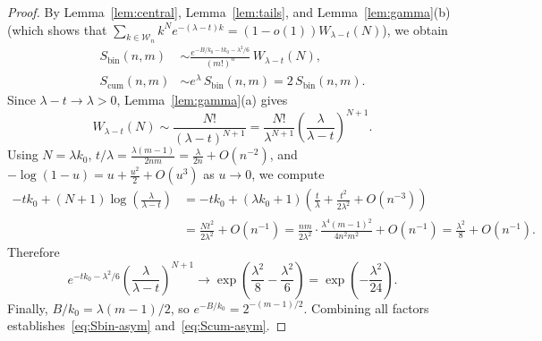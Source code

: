\documentclass[11pt,a4paper]{article}
\theoremstyle{remark}
\begin{document}
\begin{proof}
By Lemma~\ref{lem:central}, Lemma~\ref{lem:tails}, and Lemma~\ref{lem:gamma}(b) (which shows that $\sum_{k\in\mathcal{W}_n} k^N e^{-(\lambda-t)k} = (1 - o(1))W_{\lambda-t}(N)$), we obtain
\begin{align*}
  S_{\mathrm{bin}}(n,m)
  &\sim \frac{e^{-B/k_0 - t k_0 - \lambda^2/6}}{(m!)^n}\,W_{\lambda - t}(N),\\
  S_{\mathrm{cum}}(n,m)
  &\sim e^{\lambda}\,S_{\mathrm{bin}}(n,m) = 2\,S_{\mathrm{bin}}(n,m).
\end{align*}
Since $\lambda - t \to \lambda > 0$, Lemma~\ref{lem:gamma}(a) gives
\[
  W_{\lambda - t}(N) \sim \frac{N!}{(\lambda - t)^{N+1}}
  = \frac{N!}{\lambda^{N+1}}\left(\frac{\lambda}{\lambda - t}\right)^{N+1}.
\]
Using $N = \lambda k_0$, $t/\lambda = \frac{\lambda(m-1)}{2nm} = \frac{\lambda}{2n} + O(n^{-2})$, and $-\log(1-u) = u + \frac{u^2}{2} + O(u^3)$ as $u\to 0$, we compute
\begin{align*}
  -t k_0 + (N+1)\log\!\left(\frac{\lambda}{\lambda - t}\right)
  &= -t k_0 + (\lambda k_0 + 1)\!\left(\frac{t}{\lambda} + \frac{t^2}{2\lambda^2} + O(n^{-3})\right)\\
  &= \frac{N t^2}{2\lambda^2} + O(n^{-1})
   = \frac{nm}{2\lambda^2}\cdot\frac{\lambda^4(m-1)^2}{4n^2 m^2} + O(n^{-1})
   = \frac{\lambda^2}{8} + O(n^{-1}).
\end{align*}
Therefore
\[
  e^{-t k_0 - \lambda^2/6}\left(\frac{\lambda}{\lambda - t}\right)^{N+1}
  \longrightarrow \exp\!\left(\frac{\lambda^2}{8} - \frac{\lambda^2}{6}\right)
  = \exp\!\left(-\frac{\lambda^2}{24}\right).
\]
Finally, $B/k_0 = \lambda(m-1)/2$, so $e^{-B/k_0} = 2^{-(m-1)/2}$. Combining all factors establishes~\eqref{eq:Sbin-asym} and~\eqref{eq:Scum-asym}.
\end{proof}
\end{document}
